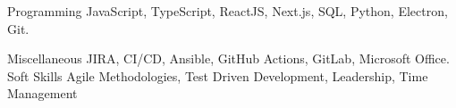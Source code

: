 

\begin{cvskills}

  \cvskill
    {Programming} %
    {JavaScript, TypeScript, ReactJS, Next.js, SQL, Python, Electron, Git.} %

  \cvskill
    {Miscellaneous} %
    {JIRA, CI/CD, Ansible, GitHub Actions, GitLab, Microsoft Office.} %
  \cvskill
    {Soft Skills} %
    {Agile Methodologies, Test Driven Development, Leadership, Time Management} %

\end{cvskills}
